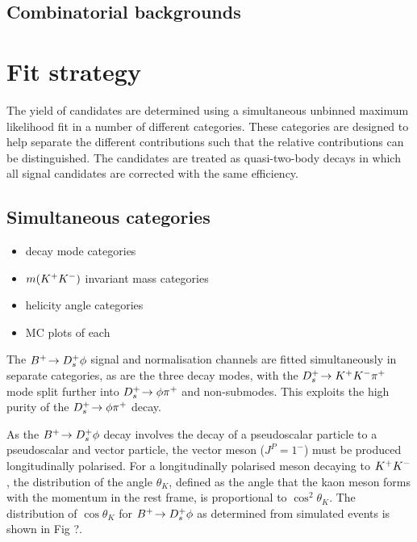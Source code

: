 \subsection{Combinatorial  backgrounds}
\label{sec:B2DsPhi_combcomps}



\section{Fit strategy}
\label{sec:B2DsPhi_fitstrategy}

The yield of \decay{\Bp}{\Dsp\phiz} candidates are determined using a simultaneous unbinned maximum likelihood fit in a number of different categories.
These categories are designed to help separate the different contributions such that the relative contributions can be distinguished.
The candidates are treated as quasi-two-body decays in which all signal candidates are corrected with the same efficiency. 



\subsection{Simultaneous categories}
\label{sec:B2DsPhi_fitstrategy}

{\color{Red}
\begin{itemize}
\item \Dsp decay mode categories
\item $m({{K}^+}{{K}^-})$ invariant mass categories 
\item helicity angle categories 
\item MC plots of each
\end{itemize}
}
The ${{{B}^+}}\!\rightarrow {\ensuremath{{D}^+_{s}}}\phi$ signal and normalisation channels are fitted simultaneously in separate categories, as are the three \Dsp decay modes, with the ${{D}^+_{s}}\!\rightarrow {\ensuremath{{K}^+}}{\ensuremath{{K}^-}}{\ensuremath{{\pi}^+}}$ mode split further into ${{D}^+_{s}}\!\rightarrow \phi {\ensuremath{{\pi}^+}}$ and non-\phiz submodes. This exploits the high purity of the ${{D}^+_{s}}\!\rightarrow \phi {\ensuremath{{\pi}^+}}$ decay.


As the ${{{B}^+}}\!\rightarrow {\ensuremath{{D}^+_{s}}}\phi$ decay involves the decay of a pseudoscalar particle to a pseudoscalar and vector particle, the \phiz vector meson ($J^{P} = 1^{-}$) must be produced longitudinally polarised. For a longitudinally polarised \phiz meson decaying to ${{K}^+}{{K}^-}$, the distribution of the angle $\theta_{K}$, defined as the angle that the kaon meson forms with the \B momentum in the \phiz rest frame, is proportional to $\cos^{2}{\theta_{K}}$. The distribution of $\cos{\theta_{K}}$ for ${{{B}^+}}\!\rightarrow {\ensuremath{{D}^+_{s}}}\phi$ as determined from simulated events is shown in Fig ?.


